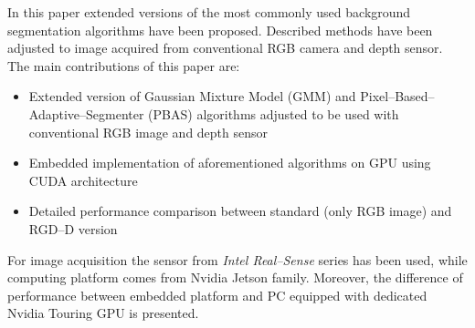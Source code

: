 \documentclass[b5paper,10pt,twoside]{article}
\begin{document}
{%





In this paper extended versions of the most commonly used background segmentation algorithms have been proposed. Described methods have been adjusted to image acquired from conventional RGB camera and depth sensor. The main contributions of this paper are:
\begin{itemize}
\item Extended version of Gaussian Mixture Model (GMM) and Pixel--Based--Adaptive--Segmenter (PBAS) algorithms adjusted to be used with conventional RGB image and depth sensor
\item Embedded implementation of aforementioned algorithms on GPU using CUDA architecture
\item Detailed performance comparison between standard (only RGB image) and RGD--D version
\end{itemize}
For image acquisition the sensor from \textit{Intel Real--Sense} series has been used, while computing platform comes from Nvidia Jetson family. Moreover, the difference of performance between embedded platform and PC equipped with dedicated Nvidia Touring GPU is presented.


}
\end{document}
